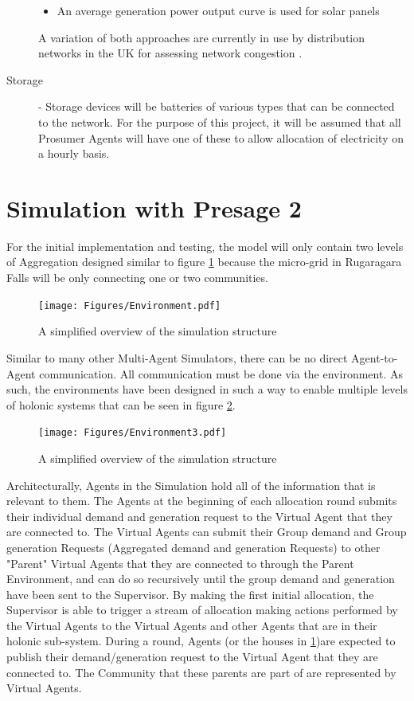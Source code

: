 \begin{description}
\begin{itemize}
  \item An average generation power output curve is used for solar panels

\end{itemize}

A variation of both approaches are currently in use by distribution networks in the UK for assessing network congestion \cite{IPSA-web-constraint:2015}.

\item[Storage] - Storage devices will be batteries of various types that can be connected to the network. For the purpose of this project, it will be assumed that all Prosumer Agents will have one of these to allow allocation of electricity on a hourly basis.
\end{description}

\section*{Simulation with Presage 2}
For the initial implementation and testing, the model will only contain two levels of Aggregation designed similar to figure \ref{fig:SimEnv} because the micro-grid in Rugaragara Falls will be only connecting one or two communities. 

\begin{figure}[h!]
	\centering
	\texttt{[image: Figures/Environment.pdf]}
	\caption{A simplified overview of the simulation structure}
	\label{fig:SimEnv}
\end{figure}

Similar to many other Multi-Agent Simulators, there can be no direct Agent-to-Agent communication. All communication must be done via the environment. As such, the environments have been designed in such a way to enable multiple levels of holonic systems that can be seen in figure \ref{fig:SimEnv2}. 

\begin{figure}[h!]
	\centering
	\texttt{[image: Figures/Environment3.pdf]}
	\caption{A simplified overview of the simulation structure}
	\label{fig:SimEnv2}
\end{figure}

Architecturally, Agents in the Simulation hold all of the information that is relevant to them. The Agents at the beginning of each allocation round submits their individual demand and generation request to the Virtual Agent that they are connected to. The Virtual Agents can submit their Group demand and Group generation Requests (Aggregated demand and generation Requests) to other "Parent" Virtual Agents that they are connected to through the Parent Environment, and can do so recursively until the group demand and generation have been sent to the Supervisor. By making the first initial allocation, the Supervisor is able to trigger a stream of allocation making actions performed by the Virtual Agents to the Virtual Agents and other Agents that are in their holonic sub-system.
During a round, Agents (or the houses in \ref{fig:SimEnv})are expected to publish their demand/generation request to the Virtual Agent that they are connected to. The Community that these parents are part of are represented by Virtual Agents. 

